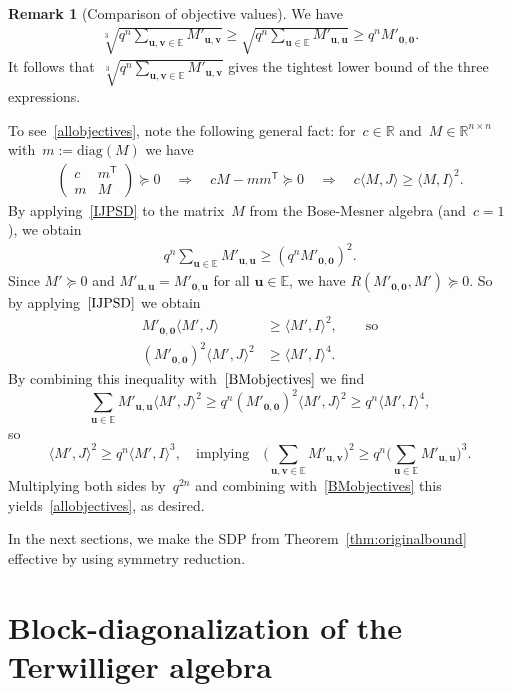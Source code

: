 \documentclass[10pt,a4paper]{article}
\newcommand{\E}{\mathbb{E}}
\newcommand{\R}{\mathbb{R}}
\theoremstyle{definition}
\newtheorem{remark}{Remark}[section]
\newcommand{\uu}{\mathbf{u}}
\newcommand{\vv}{\mathbf{v}}
\newcommand{\zero}{\mathbf{0}}
\newcommand{\inner}[2]{\langle#1,#2\rangle}
\newcommand{\T}{^{\mathsf{T}}}
\begin{document}
\begin{remark}[Comparison of objective values]
We have
\begin{align}\label{allobjectives}
\sqrt[3]{q^n \sum_{\uu,\vv \in \E} M'_{\uu,\vv} } \geq  \sqrt{ q^n\sum_{\uu \in \E} M'_{\uu,\uu}} \geq q^n M'_{\zero,\zero}.
\end{align}
It follows that~$\sqrt[3]{q^n \sum_{\uu,\vv \in \E} M'_{\uu,\vv} }$ gives the tightest lower bound of the three expressions. 

To see~\eqref{allobjectives}, note the following general fact: for~$c \in \R$ and~$M \in \R^{n \times n}$ with~$m:=\text{diag}(M)$  we have
\begin{align}\label{IJPSD}
\begin{pmatrix} c & m\T \\m & M \end{pmatrix} \succeq 0 \quad \Longrightarrow \quad cM-mm\T \succeq 0
\quad \Longrightarrow \quad
c  \inner{M}{J} \geq \inner{M}{I}^2.
\end{align}
By applying~\eqref{IJPSD} to the matrix~$M$ from the Bose-Mesner algebra (and~$c=1$), we obtain
\begin{align}\label{BMobjectives}
q^n \sum_{\uu \in \E} M'_{\uu,\uu} \geq  (q^n M'_{\zero,\zero})^2.
\end{align}
Since $M'\succeq 0$ and $M'_{\uu,\uu}=M'_{\zero,\uu}$ for all $\uu\in\E$, we have $R(M'_{\zero,\zero},M')\succeq 0$. So by applying~$\eqref{IJPSD}$ we obtain
\begin{align*}
M'_{\zero,\zero}\inner{M'}{J}&\geq \inner{M'}{I}^2, \quad\quad \text{so}
\\(M'_{\zero,\zero})^2 \inner{M'}{J}^2 &\geq \inner{M'}{I}^4. 
\end{align*}
By combining this inequality with~$\eqref{BMobjectives}$ we find
\[
\sum_{\uu \in \E} M'_{\uu,\uu} \inner{M'}{J}^2  \geq q^n (M'_{\zero,\zero})^2 \inner{M'}{J}^2 \geq q^n \inner{M'}{I}^4, 
\]
so 
\[
\inner{M'}{J}^2  \geq q^{n} \inner{M'}{I}^3, \quad \text{implying} \quad 
\big( \sum_{\uu,\vv \in \E} M'_{\uu,\vv}\big)^2 \geq q^n \big(\sum_{\uu \in \E} M'_{\uu,\uu} \big)^3.
\]
Multiplying both sides by~$q^{2n}$
and combining with~\eqref{BMobjectives}  this yields~\eqref{allobjectives}, as desired.
\end{remark}


In the next sections, we make the SDP from Theorem~\ref{thm:originalbound} effective by using symmetry reduction.



\section{Block-diagonalization of the Terwilliger algebra\label{sec:terwilliger}}
\end{document}

